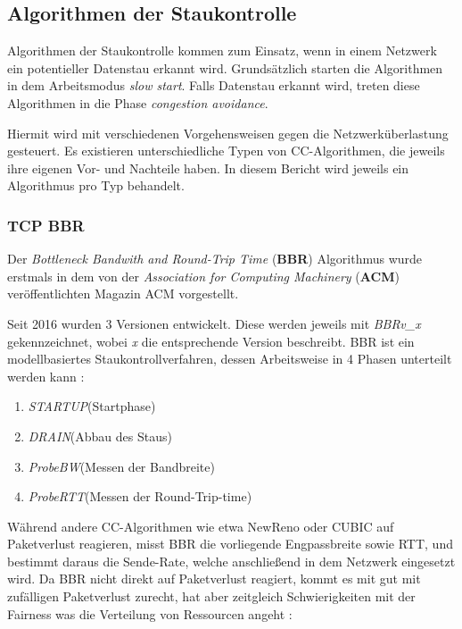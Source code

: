 \documentclass[paper=a4,fontsize=12pt,ngerman]{scrartcl}
\begin{document}
\subsection{Algorithmen der Staukontrolle }

Algorithmen der Staukontrolle kommen zum Einsatz, wenn in einem Netzwerk ein potentieller Datenstau erkannt wird.
Grundsätzlich starten die Algorithmen in dem Arbeitsmodus \textit{slow start}.
Falls Datenstau erkannt wird, treten diese Algorithmen in die Phase \textit{congestion avoidance}.


Hiermit wird mit verschiedenen Vorgehensweisen gegen die Netzwerküberlastung gesteuert. 
\newline
Es existieren unterschiedliche Typen von CC-Algorithmen, die jeweils ihre eigenen Vor- und Nachteile haben.
In diesem Bericht wird jeweils ein Algorithmus pro Typ behandelt.





\subsubsection{TCP BBR} 
Der \textit{Bottleneck Bandwith and Round-Trip Time} (\textbf{BBR}) Algorithmus wurde erstmals in dem von der
\textit{Association for Computing Machinery} (\textbf{ACM}) veröffentlichten Magazin ACM vorgestellt. \cite{cardwell-iccrg-bbr-congestion-control-02}

Seit 2016 wurden 3 Versionen entwickelt. Diese werden jeweils mit \textit{BBRv\_x} gekennzeichnet, 
wobei \textit{x} die entsprechende Version beschreibt. 
BBR ist ein modellbasiertes Staukontrollverfahren, dessen Arbeitsweise in 4 Phasen
unterteilt werden kann : \newline

\begin{enumerate}
    \item \textit{STARTUP}(Startphase)
    \item \textit{DRAIN}(Abbau des Staus)
    \item \textit{ProbeBW}(Messen der Bandbreite)
    \item \textit{ProbeRTT}(Messen der Round-Trip-time)
\end{enumerate}


Während andere CC-Algorithmen wie etwa NewReno oder CUBIC auf Paketverlust reagieren, misst BBR die vorliegende Engpassbreite sowie RTT,
und bestimmt daraus die Sende-Rate, welche anschließend in dem Netzwerk eingesetzt wird. 
Da BBR nicht direkt auf Paketverlust reagiert, kommt es mit gut mit zufälligen Paketverlust zurecht, hat aber zeitgleich
Schwierigkeiten mit der Fairness was die Verteilung von Ressourcen angeht : 
\end{document}

